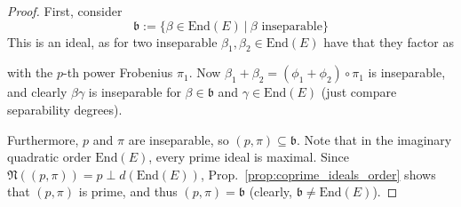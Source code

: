 \documentclass{ociamthesis}
\newcommand{\End}{\mathrm{End}}
\newcommand{\Norm}{\mathfrak{N}}
\renewcommand{\b}{\mathfrak{b}}
\theoremstyle{definition}
\begin{document}
\begin{proof}
    First, consider
    \begin{equation*}
        \b := \{ \beta \in \End(E) \ | \ \text{$\beta$ inseparable} \}
    \end{equation*}
    This is an ideal, as for two inseparable $\beta_1, \beta_2 \in \End(E)$ have that they factor as
    \begin{center}
    \end{center}
    with the $p$-th power Frobenius $\pi_1$.
    Now $\beta_1 + \beta_2 = (\phi_1 + \phi_2) \circ \pi_1$ is inseparable, and clearly $\beta \gamma$ is inseparable for $\beta \in \b$ and $\gamma \in \End(E)$ (just compare separability degrees).

    Furthermore, $p$ and $\pi$ are inseparable, so $(p, \pi) \subseteq \b$.
    Note that in the imaginary quadratic order $\End(E)$, every prime ideal is maximal.
    Since $\Norm((p, \pi)) = p \perp d(\End(E))$, Prop.~\ref{prop:coprime_ideals_order} shows that $(p, \pi)$ is prime, and thus $(p, \pi) = \b$ (clearly, $\b \neq \End(E)$).
\end{proof}
\end{document}
